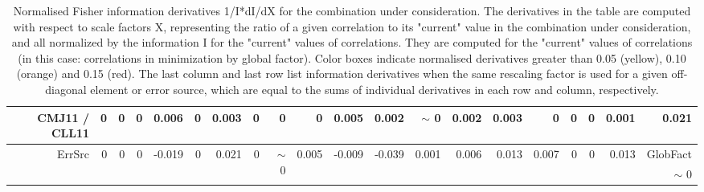 \begin{table}[H]
\begin{center}
\begin{tabular}{|r|rrrrrrrrrrrrrrrrrr|r|}
CMJ11 / CLL11 &  0 &  0 &  0 &      0.006 &  0 &      0.003 &  0 &  0 &  0 &      0.005 &      0.002 &  {\tiny $\sim$ }0 &      0.002 &      0.003 &  0 &  0 &  0 &      0.001 &      0.021 \\
\hline
\multirow{2}{*}{ErrSrc} & \multirow{2}{*}{ 0} & \multirow{2}{*}{ 0} & \multirow{2}{*}{ 0} & \multirow{2}{*}{    -0.019} & \multirow{2}{*}{ 0} & \multirow{2}{*}{     0.021} & \multirow{2}{*}{ 0} & \multirow{2}{*}{ {\tiny $\sim$ }0} & \multirow{2}{*}{     0.005} & \multirow{2}{*}{    -0.009} & \multirow{2}{*}{    -0.039} & \multirow{2}{*}{     0.001} & \multirow{2}{*}{     0.006} & \multirow{2}{*}{     0.013} & \multirow{2}{*}{     0.007} & \multirow{2}{*}{ 0} & \multirow{2}{*}{ 0} & \multirow{2}{*}{     0.013} & GlobFact\\
 & & & & & & & & & & & & & & & & & & &  {\tiny $\sim$ }0 \\
\hline
\end{tabular}
\renewcommand{\arraystretch}{1}
\caption{Normalised Fisher information derivatives 1/I*dI/dX for the combination under consideration. The derivatives in the table are computed with respect to scale factors X, representing the ratio of a given correlation to its "current" value in the combination under consideration, and all normalized by the information I for the "current" values of correlations. They are computed for the "current" values of correlations (in this case: correlations in minimization by global factor). Color boxes indicate normalised derivatives greater than 0.05 (yellow), 0.10 (orange) and 0.15 (red). The last column and last row list information derivatives when the same rescaling factor is used for a given off-diagonal element or error source, which are equal to the sums of individual derivatives in each row and column, respectively.}
\end{center}
\end{table}

